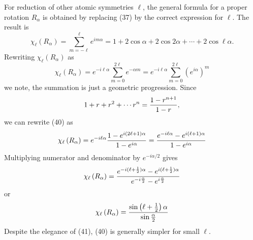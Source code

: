 For reduction of other atomic symmetries $\ell$, the general formula 
for a proper rotation $R_{\alpha}$ is obtained by replacing (37) by 
the correct expression for $\ell$.  The result is
\begin{equation}
\chi_{\ell} \left( R_{\alpha} \right) = \sum_{m=-\ell}^{\ell} 
e^{im\alpha} = 1 + 2 \cos \alpha + 2 \cos 2 \alpha + \cdots + 2 \cos 
\ell \alpha.
\label{chap16-eqno40}
\end{equation}
Rewriting $\chi_{\ell} ( R_{\alpha} )$ as
\begin{equation}
\chi_{\ell} \left( R_{\alpha} \right) = e^{-i \ell \alpha} \sum^{2 
\ell}_{m=0} e^{- \alpha m} = e^{- i \ell \alpha} \sum^{2 \ell}_{m=0} 
\left( e^{i \alpha} \right)^m
\end{equation}
we note, the summation is just a geometric progression.  Since
\begin{equation}
1 + r + r^2 + \cdots r^n = {1 - r^{n+1} \over 1 - r},
\end{equation}
we can rewrite (40) as
\begin{equation}
\chi_{\ell} \left( R_{\alpha} \right) = e^{- i \ell \alpha} {1 - 
e^{i(2\ell+1)\alpha} \over 1 - e^{i \alpha}} = {e^{-i \ell \alpha} - 
e^{i(\ell+1)\alpha} \over 1 - e^{i \alpha}}
\end{equation}
Multiplying numerator and denominator by $e^{-i\alpha/2}$ gives
\begin{equation}
\chi_{\ell} \left( R_{\alpha} \right) = {e^{-i(\ell+{1 \over 
2})\alpha} - e^{i (\ell + {1 \over 2} )\alpha} \over e^{-i{\alpha 
\over 2}} - e^{i{\alpha \over 2}}}
\end{equation}
or
\begin{equation}
\chi_{\ell} \left( R_{\alpha} \right) = {\sin \left( \ell + {1 \over 
2} \right) \alpha \over \sin {\alpha \over 2}}
\label{chap16-eqno41}
\end{equation}
Despite the elegance of (41), (40) is generally simpler for small 
$\ell$.

